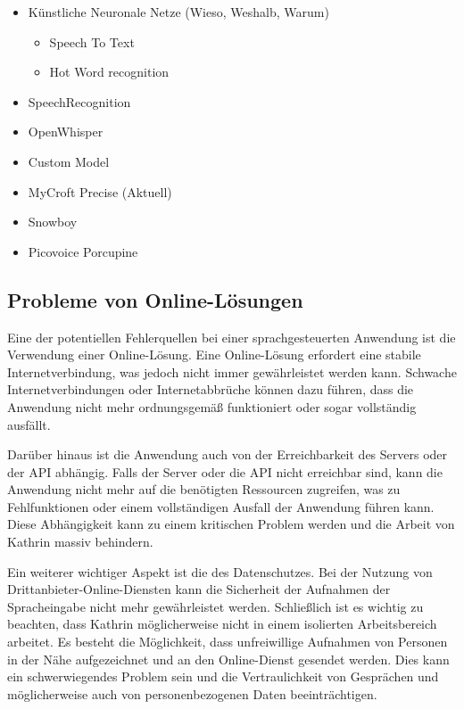 \documentclass[../main.tex]{subfiles}
\begin{document}
\begin{itemize}
    \item Künstliche Neuronale Netze (Wieso, Weshalb, Warum)
    \begin{itemize}
        \item Speech To Text
        \item Hot Word recognition
    \end{itemize}
    \item SpeechRecognition
    \item OpenWhisper
    \item Custom Model
    \item MyCroft Precise (Aktuell)
    \item Snowboy
    \item Picovoice Porcupine
\end{itemize}

\subsection{Probleme von Online-Lösungen}

Eine der potentiellen Fehlerquellen bei einer sprachgesteuerten Anwendung ist die Verwendung einer Online-Lösung. Eine Online-Lösung erfordert eine stabile Internetverbindung, was jedoch nicht immer gewährleistet werden kann. Schwache Internetverbindungen oder Internetabbrüche können dazu führen, dass die Anwendung nicht mehr ordnungsgemäß funktioniert oder sogar vollständig ausfällt.

Darüber hinaus ist die Anwendung auch von der Erreichbarkeit des Servers oder der API abhängig. Falls der Server oder die API nicht erreichbar sind, kann die Anwendung nicht mehr auf die benötigten Ressourcen zugreifen, was zu Fehlfunktionen oder einem vollständigen Ausfall der Anwendung führen kann. Diese Abhängigkeit kann zu einem kritischen Problem werden und die Arbeit von Kathrin massiv behindern.

Ein weiterer wichtiger Aspekt ist die des Datenschutzes. Bei der Nutzung von Drittanbieter-Online-Diensten kann die Sicherheit der Aufnahmen der Spracheingabe nicht mehr gewährleistet werden. Schließlich ist es wichtig zu beachten, dass Kathrin möglicherweise nicht in einem isolierten Arbeitsbereich arbeitet. Es besteht die Möglichkeit, dass unfreiwillige Aufnahmen von Personen in der Nähe aufgezeichnet und an den Online-Dienst gesendet werden. Dies kann ein schwerwiegendes Problem sein und die Vertraulichkeit von Gesprächen und möglicherweise auch von personenbezogenen Daten beeinträchtigen.
\end{document}
